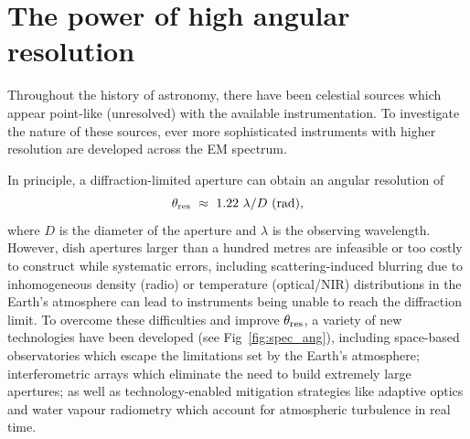 \section{The power of high angular resolution}
Throughout the history of astronomy, there have been celestial sources which appear point-like (unresolved) with the available instrumentation. To investigate the nature of these sources, ever more sophisticated instruments with higher resolution are developed across the EM spectrum. 

In principle, a diffraction-limited aperture can obtain an angular resolution of
\begin{equation}\label{eq:ang_res}
 \theta_{\rm res}\ \approx \ 1.22\ \lambda / D\ {\rm (rad)},
\end{equation}
where $D$ is the diameter of the aperture and $\lambda$ is the observing wavelength. However, dish apertures larger than a hundred metres are infeasible or too costly to construct while systematic errors, including scattering-induced blurring due to inhomogeneous density (radio) or temperature (optical/NIR) distributions in the Earth's atmosphere can lead to instruments being unable to reach the diffraction limit. To overcome these difficulties and improve $\theta_{\rm res}$, a variety of new technologies have been developed (see Fig~\ref{fig:spec_ang}), including space-based observatories which escape the limitations set by the Earth's atmosphere; interferometric arrays which eliminate the need to build extremely large apertures; as well as technology-enabled mitigation strategies like adaptive optics and water vapour radiometry which account for atmospheric turbulence in real time. 


